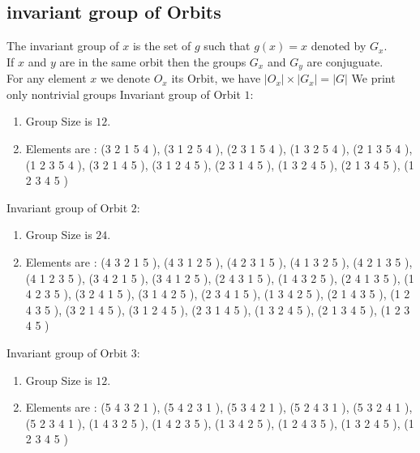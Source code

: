 \documentclass[12pt]{article}
\begin{document}
\subsection{invariant group of Orbits}
\noindent The invariant group of $x$ is the set of $g$ such that $g(x)=x$ denoted by $G_x$.\\
If $x$ and $y$ are in the same orbit then the groups $G_x$ and  $G_y$ are conjuguate.\\
For any element $x$ we denote $O_x$ its Orbit, we have $|O_x|\times |G_x|=|G|$
We print only nontrivial groups
Invariant group of Orbit $1$:
\begin{enumerate}
\item Group Size is $12$.
\item Elements are : (3 2 1 5 4  ), (3 1 2 5 4  ), (2 3 1 5 4  ), (1 3 2 5 4  ), (2 1 3 5 4  ), (1 2 3 5 4  ), (3 2 1 4 5  ), (3 1 2 4 5  ), (2 3 1 4 5  ), (1 3 2 4 5  ), (2 1 3 4 5  ), (1 2 3 4 5  )
\end{enumerate}
Invariant group of Orbit $2$:
\begin{enumerate}
\item Group Size is $24$.
\item Elements are : (4 3 2 1 5  ), (4 3 1 2 5  ), (4 2 3 1 5  ), (4 1 3 2 5  ), (4 2 1 3 5  ), (4 1 2 3 5  ), (3 4 2 1 5  ), (3 4 1 2 5  ), (2 4 3 1 5  ), (1 4 3 2 5  ), (2 4 1 3 5  ), (1 4 2 3 5  ), (3 2 4 1 5  ), (3 1 4 2 5  ), (2 3 4 1 5  ), (1 3 4 2 5  ), (2 1 4 3 5  ), (1 2 4 3 5  ), (3 2 1 4 5  ), (3 1 2 4 5  ), (2 3 1 4 5  ), (1 3 2 4 5  ), (2 1 3 4 5  ), (1 2 3 4 5  )
\end{enumerate}
Invariant group of Orbit $3$:
\begin{enumerate}
\item Group Size is $12$.
\item Elements are : (5 4 3 2 1  ), (5 4 2 3 1  ), (5 3 4 2 1  ), (5 2 4 3 1  ), (5 3 2 4 1  ), (5 2 3 4 1  ), (1 4 3 2 5  ), (1 4 2 3 5  ), (1 3 4 2 5  ), (1 2 4 3 5  ), (1 3 2 4 5  ), (1 2 3 4 5  )
\end{enumerate}
\end{document}
